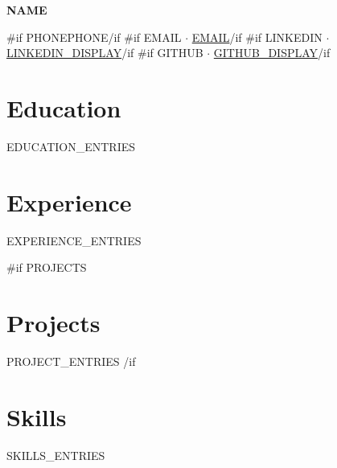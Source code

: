 \documentclass[letterpaper,11pt]{article}
\begin{document}
{\Large\bfseries {{NAME}}}

\smallskip
\small
{{#if PHONE}}{{PHONE}}{{/if}}%
{{#if EMAIL}} $\cdot$ \href{mailto:{{EMAIL}}}{{{EMAIL}}}{{/if}}%
{{#if LINKEDIN}} $\cdot$ \href{{{LINKEDIN}}}{{{LINKEDIN_DISPLAY}}}{{/if}}%
{{#if GITHUB}} $\cdot$ \href{{{GITHUB}}}{{{GITHUB_DISPLAY}}}{{/if}}

\vspace{6pt}

\section{Education}
{{EDUCATION_ENTRIES}}

\section{Experience}
{{EXPERIENCE_ENTRIES}}

{{#if PROJECTS}}
\section{Projects}
{{PROJECT_ENTRIES}}
{{/if}}

\section{Skills}
\small{{SKILLS_ENTRIES}}
\end{document}
